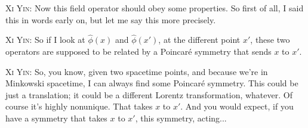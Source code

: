 \noindent\textsc{Xi Yin:} Now this field operator should obey some properties. So first of all, I said this in words early on, but let me say this more precisely.\par

\noindent\textsc{Xi Yin:} So if I look at $\hat\phi(x)$ and $\hat\phi(x')$, at the different point $x'$, these two operators are supposed to be related by a Poincaré symmetry that sends $x$ to $x'$.\par

\noindent\textsc{Xi Yin:} So, you know, given two spacetime points, and because we're in Minkowski spacetime, I can always find some Poincaré symmetry. This could be just a translation; it could be a different Lorentz transformation, whatever. Of course it's highly nonunique. That takes $x$ to $x'$. And you would expect, if you have a symmetry that takes $x$ to $x'$, this symmetry, acting...\par

